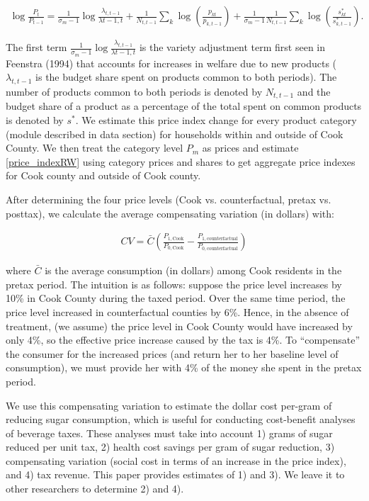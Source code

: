 \documentclass[12pt]{article}
\begin{document}
\begin{align}
    \log \frac{P_t}{P_{t-1}} = \frac{1  }{\sigma_m-1} \log \frac{\lambda_{t,t-1}}{\lambda{t-1,t}} + \frac{1}{N_{t,t-1}} \sum_k \log \left(  \frac{p_{kt}}{p_{k,t-1}}\right) + \frac{1}{\sigma_m -1}\frac{1}{N_{t,t-1}} \sum_k \log\left(\frac{s^*_{kt}}{s^*_{k,t-1}} \right) \label{price_indexRW} .
\end{align}

The first term $\frac{1  }{\sigma_m-1} \log \frac{\lambda_{t,t-1}}{\lambda{t-1,t}}$ is the variety adjustment term first seen in Feenstra (1994) that accounts for increases in welfare due to new products ($\lambda_{t,t-1}$ is the budget share spent on products common to both periods). The number of products common to both periods is denoted by $N_{t,t-1}$ and the budget share of a product as a percentage of the total spent on common products is denoted by $s^*$. We estimate this price index change for every product category (module described in data section) for households within and outside of Cook County. We then treat the category level $P_m$ as prices and estimate \eqref{price_indexRW} using category prices and shares to get aggregate price indexes for Cook county and outside of Cook county.

After determining the four price levels (Cook vs. counterfactual, pretax vs. posttax), we  calculate the average compensating variation (in dollars) with:

\begin{align}
CV = \bar{C}\left(\frac{P_{1,\text{Cook}}}{P_{0,\text{Cook}}} - \frac{P_{1,\text{counterfactual}}}{P_{0,\text{counterfactual}}}\right) \label{cv}
\end{align}

where $\bar{C}$ is the average consumption (in dollars) among Cook residents in the pretax period. The intuition is as follows: suppose the price level increases by 10\% in Cook County during the taxed period. Over the same time period, the price level increased in counterfactual counties by 6\%. Hence, in the absence of treatment, (we assume) the price level in Cook County would have increased by only 4\%, so the effective price increase caused by the tax is 4\%. To ``compensate'' the consumer for the increased prices (and return her to her baseline level of consumption), we must provide her with 4\% of the money she spent in the pretax period.

We use this compensating variation to estimate the dollar cost per-gram of reducing sugar consumption, which is useful for conducting cost-benefit analyses of beverage taxes. These analyses must take into account 1) grams of sugar reduced per unit tax, 2) health cost savings per gram of sugar reduction, 3) compensating variation (social cost in terms of an increase in the price index), and 4) tax revenue. This paper provides estimates of 1) and 3). We leave it to other researchers to determine 2) and 4).
\end{document}
